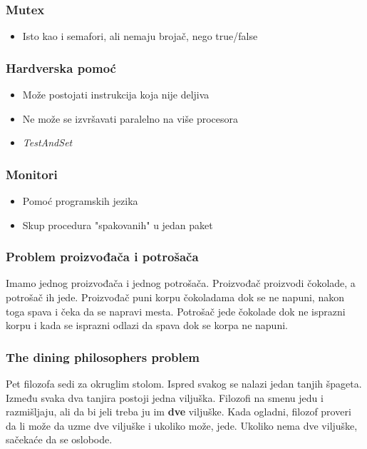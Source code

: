 \documentclass{beamer}
\begin{document}
\begin{frame}
    \frametitle{Mutex}
    \begin{itemize}
        \item Isto kao i semafori, ali nemaju brojač, nego true/false
    \end{itemize}
\end{frame}

\begin{frame}
    \frametitle{Hardverska pomoć}
    \begin{itemize}
        \item Može postojati instrukcija koja nije deljiva \newline
        \item Ne može se izvršavati paralelno na više procesora \newline
        \item \textit{TestAndSet}
    \end{itemize}
\end{frame}

\begin{frame}
    \frametitle{Monitori}
    \begin{itemize}
        \item Pomoć programskih jezika \newline
        \item Skup procedura "spakovanih" u jedan paket \newline
    \end{itemize}

\end{frame}

\begin{frame}
    \frametitle{Problem proizvođača i potrošača}
    \begin{center}
        Imamo jednog proizvođača i jednog potrošača. Proizvođač proizvodi čokolade, a potrošač ih jede. Proizvođač puni korpu čokoladama dok se ne napuni, nakon toga spava i čeka da se napravi mesta. Potrošač jede čokolade dok ne isprazni korpu i kada se isprazni odlazi da spava dok se korpa ne napuni.
    \end{center}

\end{frame}

\begin{frame}
    \frametitle{The dining philosophers problem}
    \begin{center}
        \item Pet filozofa sedi za okruglim stolom. Ispred svakog se nalazi jedan tanjih špageta. Između svaka dva tanjira postoji jedna viljuška. Filozofi na smenu jedu i razmišljaju, ali da bi jeli treba ju im \textbf{dve} viljuške. Kada ogladni, filozof proveri da li može da uzme dve viljuške i ukoliko može, jede. Ukoliko nema dve viljuške, sačekaće da se oslobode.
    \end{center}
\end{frame}
\end{document}
